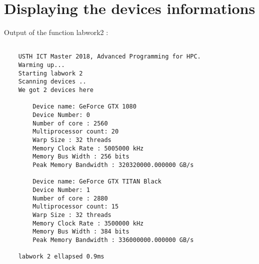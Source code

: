 \documentclass[paper=a4, fontsize=11pt]{scrartcl}
\begin{document}
\section{Displaying the devices informations}

Output of the function labwork2 : 


	\begin{verbatim}

	USTH ICT Master 2018, Advanced Programming for HPC.
	Warming up...
	Starting labwork 2
	Scanning devices ..
	We got 2 devices here

		Device name: GeForce GTX 1080
		Device Number: 0
		Number of core : 2560
		Multiprocessor count: 20
		Warp Size : 32 threads
		Memory Clock Rate : 5005000 kHz
		Memory Bus Width : 256 bits
		Peak Memory Bandwidth : 320320000.000000 GB/s

		Device name: GeForce GTX TITAN Black
		Device Number: 1
		Number of core : 2880
		Multiprocessor count: 15
		Warp Size : 32 threads
		Memory Clock Rate : 3500000 kHz
		Memory Bus Width : 384 bits
		Peak Memory Bandwidth : 336000000.000000 GB/s

	labwork 2 ellapsed 0.9ms


	\end{verbatim}
\end{document}
